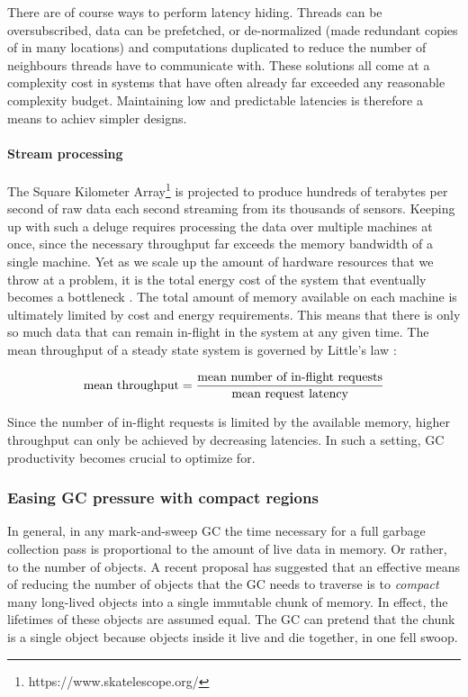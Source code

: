 \documentclass[11pt]{article}
\begin{document}
There are of course ways to perform latency hiding. Threads can be
oversubscribed, data can be prefetched, or de-normalized (made
redundant copies of in many locations) and computations duplicated to
reduce the number of neighbours threads have to communicate with.
These solutions all come at a complexity cost in systems that have
often already far exceeded any reasonable complexity budget.
Maintaining low and predictable latencies is therefore a means to
achiev simpler designs.

\paragraph{Stream processing} The Square Kilometer
Array\footnote{https://www.skatelescope.org/} is projected to produce
hundreds of terabytes per second of raw data each second streaming
from its thousands of sensors. Keeping up with such a deluge requires
processing the data over multiple machines at once, since the
necessary throughput far exceeds the memory bandwidth of a single
machine. Yet as we scale up the amount of hardware resources that we
throw at a problem, it is the total energy cost of the system that
eventually becomes a bottleneck \cite{doe_exascale_2010}. The total
amount of memory available on each machine is ultimately limited by
cost and energy requirements. This means that there is only so much
data that can remain in-flight in the system at any given time. The
mean throughput of a steady state system is governed by Little's law
\cite{little_proof_1961}:

\begin{displaymath}
  \textrm{mean throughput} = {\textrm{mean number of in-flight
      requests} \over \textrm{mean request latency}}
\end{displaymath}

Since the number of in-flight requests is limited by the available
memory, higher throughput can only be achieved by decreasing
latencies. In such a setting, GC productivity becomes crucial to
optimize for.

\subsubsection{Easing GC pressure with compact regions}

In general, in any mark-and-sweep GC the time necessary for a full
garbage collection pass is proportional to the amount of live data in
memory. Or rather, to the number of objects. A recent proposal
\cite{yang_compact_2015} has suggested that an effective means of
reducing the number of objects that the GC needs to traverse is to
{\em compact} many long-lived objects into a single immutable chunk of
memory. In effect, the lifetimes of these objects are assumed equal.
The GC can pretend that the chunk is a single object because objects
inside it live and die together, in one fell swoop.
\end{document}
